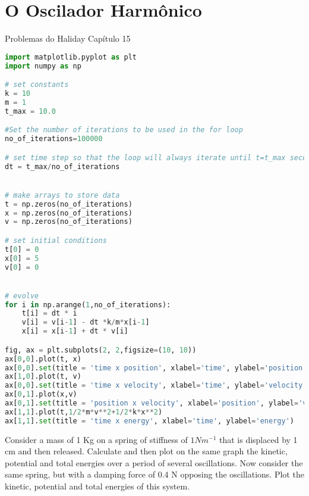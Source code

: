 \chapter{O Oscilador Harmônico}
Problemas do Haliday Capítulo 15

\begin{lstlisting}[language=Python, frame=lines, basicstyle=\footnotesize, caption={Oscilador Harmônico Simples}, label={lst:OHS}]
import matplotlib.pyplot as plt
import numpy as np

# set constants
k = 10
m = 1
t_max = 10.0

#Set the number of iterations to be used in the for loop
no_of_iterations=100000

# set time step so that the loop will always iterate until t=t_max seconds 
dt = t_max/no_of_iterations


# make arrays to store data
t = np.zeros(no_of_iterations)
x = np.zeros(no_of_iterations)
v = np.zeros(no_of_iterations)

# set initial conditions
t[0] = 0
x[0] = 5
v[0] = 0


# evolve
for i in np.arange(1,no_of_iterations):
    t[i] = dt * i
    v[i] = v[i-1] - dt *k/m*x[i-1]
    x[i] = x[i-1] + dt * v[i]

fig, ax = plt.subplots(2, 2,figsize=(10, 10))
ax[0,0].plot(t, x)
ax[0,0].set(title = 'time x position', xlabel='time', ylabel='position')
ax[1,0].plot(t, v)
ax[0,0].set(title = 'time x velocity', xlabel='time', ylabel='velocity')
ax[0,1].plot(x,v)
ax[0,1].set(title = 'position x velocity', xlabel='position', ylabel='velocity')
ax[1,1].plot(t,1/2*m*v**2+1/2*k*x**2)
ax[1,1].set(title = 'time x energy', xlabel='time', ylabel='energy')

\end{lstlisting}

Consider a mass of 1 Kg on a spring of stiffness of $1 Nm^{-1}$ that is displaced by 1 cm and then released. Calculate and then plot on the same graph the kinetic, potential and total energies over a period of several oscillations. Now consider the same spring, but with a damping force of 0.4 N opposing the oscillations. Plot the kinetic, potential and total energies of this system.



